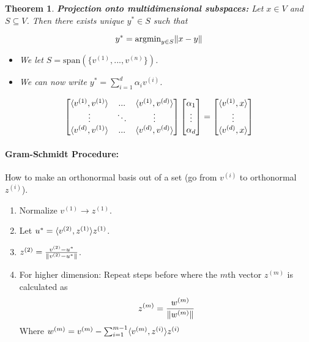 \documentclass[a4paper,12pt]{report}
\DeclarePairedDelimiter\norm{\lVert}{\rVert}%
\DeclarePairedDelimiter\inpr{\langle}{\rangle}%
\newtheorem{theorem}{Theorem}
\begin{document}
\begin{theorem} \textbf{Projection onto multidimensional subspaces: } Let $x\in V$ and $S \subseteq V$. Then there exists unique $y^* \in S$ such that

\begin{equation}
y^* = \text{argmin}_{y\in S} \norm{x-y}
\end{equation}

\begin{itemize}
\item We let $S = \text{span}(\{v^{(1)}, ..., v^{(n)}\})$. 
\item We can now write $y^* = \sum_{i=1}^{d} \alpha_i v^{(i)}$.
\end{itemize}

\begin{equation}
\begin{bmatrix}
\inpr{v^{(1)}, v^{(1)}} & ... & \inpr{v^{(1)}, v^{(d)}}\\
\vdots & \ddots & \vdots \\
\inpr{v^{(d)}, v^{(1)}} & ... & \inpr{v^{(d)}, v^{(d)}}
\end{bmatrix}
\begin{bmatrix}
\alpha_1 \\
\vdots \\
\alpha_d
\end{bmatrix} = 
\begin{bmatrix}
\inpr{v^{(1)}, x} \\
\vdots \\
\inpr{v^{(d)}, x}
\end{bmatrix}
\end{equation}


\end{theorem}

\paragraph{Gram-Schmidt Procedure: } How to make an orthonormal basis out of a set (go from $v^{(i)}$ to orthonormal $z^{(i)}$).

\begin{enumerate}
\item Normalize $v^{(1)} \to z^{(1)}$.
\item Let $u^* = \inpr{v^{(2)}, z^{(1)}}z^{(1)}$.
\item $z^{(2)} = \frac{v^{(2)} - u^*}{\norm{v^{(2)} - u^* }}$.
\item For higher dimension: Repeat steps before where the $m$th vector $z^{(m)}$ is calculated as 
$$z^{(m)} = \frac{w^{(m)}}{\norm{w^{(m)}}}$$
Where $w^{(m)} = v^{(m)} - \sum_{i=1}^{m-1} \inpr{v^{(m)} , z^{(i)}} z^{(i)}$
\end{enumerate}
\end{document}

